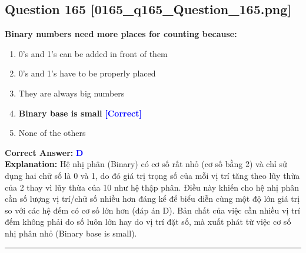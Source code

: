 \documentclass[11pt,a4paper]{article}
\begin{document}
\begin{minipage}{\textwidth}
\subsection*{Question 165 \quad \footnotesize{[0165\_q165\_Question\_165.png]}}
\noindent \textbf{Binary numbers need more places for counting because:}

\begin{enumerate}[label=\Alph*.]
    \item 0's and 1's can be added in front of them
    \item 0's and 1's have to be properly placed
    \item They are always big numbers
    \item \textbf{Binary base is small} \hfill \textcolor{blue}{\textbf{[Correct]}}
    \item None of the others
\end{enumerate}

\noindent \textbf{Correct Answer:} \textcolor{blue}{\textbf{D}} \\[2pt]
\noindent \textbf{Explanation:} Hệ nhị phân (Binary) có cơ số rất nhỏ (cơ số bằng 2) và chỉ sử dụng hai chữ số là 0 và 1, do đó giá trị trọng số của mỗi vị trí tăng theo lũy thừa của 2 thay vì lũy thừa của 10 như hệ thập phân. Điều này khiến cho hệ nhị phân cần số lượng vị trí/chữ số nhiều hơn đáng kể để biểu diễn cùng một độ lớn giá trị so với các hệ đếm có cơ số lớn hơn (đáp án D). Bản chất của việc cần nhiều vị trí đếm không phải do số luôn lớn hay do vị trí đặt số, mà xuất phát từ việc cơ số nhị phân nhỏ (Binary base is small).

\par\vspace{0.3cm}
\hrule
\vspace{0.3cm}
\end{minipage}
\end{document}

